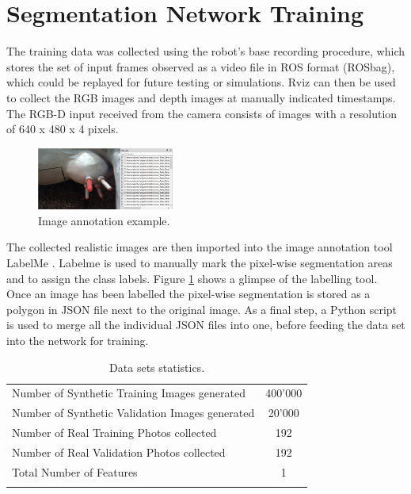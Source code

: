 \section{Segmentation Network Training}\label{chap:4:train_data}

The training data was collected using the robot's base recording procedure, which stores the set of input frames observed as a video file in ROS format (ROSbag), which could be replayed for future testing or simulations. Rviz can then be used to collect the RGB images and depth images at manually indicated timestamps. The RGB-D input received from the camera consists of images with a resolution of 640 x 480 x 4 pixels. 

\begin{figure}[h]
    \centering
    \includegraphics[width=0.4\textwidth]{images/cow_labelme.png}
    \caption{Image annotation example.}
    \label{fig:cow_labelme}
\end{figure}
The collected realistic images are then imported into the image annotation tool LabelMe \cite{2021labelme}. Labelme is used to manually mark the pixel-wise segmentation areas and to assign the class labels.  Figure \ref{fig:cow_labelme} shows a glimpse of the labelling tool. Once an image has been labelled the pixel-wise segmentation is stored as a polygon in JSON file next to the original image. As a final step, a Python script is used to merge all the individual JSON files into one, before feeding the data set into the network for training.

\begin{longtable}{@{} p{8cm} c @{}} \toprule
Number of Synthetic Training Images generated                   & 400'000 \\ \cmidrule{1-2}
Number of Synthetic Validation Images generated                   & 20'000 \\ \cmidrule{1-2}
Number of Real Training Photos collected             & 192 \\ \cmidrule{1-2}
Number of Real Validation Photos collected             & 192 \\ \cmidrule{1-2}
Total Number of Features                    & 1 \\ \bottomrule
\caption{Data sets statistics.} \label{tab:dataset-statistics} \\
\end{longtable}


